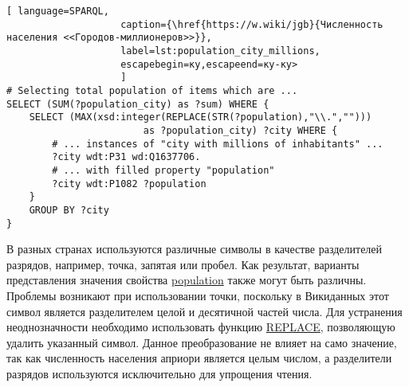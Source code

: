 
\begin{lstlisting}[ language=SPARQL, 
                    caption={\href{https://w.wiki/jgb}{Численность населения <<Городов-миллионеров>>}},
                    label=lst:population_city_millions, 
                    escapebegin=ку,escapeend=ку-ку>
                    ]
# Selecting total population of items which are ...
SELECT (SUM(?population_city) as ?sum) WHERE {
	SELECT (MAX(xsd:integer(REPLACE(STR(?population),"\\.",""))) 
						as ?population_city) ?city WHERE {
		# ... instances of "city with millions of inhabitants" ...
		?city wdt:P31 wd:Q1637706.
		# ... with filled property "population"
		?city wdt:P1082 ?population
	}
	GROUP BY ?city
}
\end{lstlisting}

В разных странах используются различные символы в качестве разделителей разрядов, например, точка, запятая или пробел. Как результат, варианты представления значения свойства \href{https://www.wikidata.org/wiki/Property:P1082}{population} также могут быть различны. Проблемы возникают при использовании точки, поскольку в Викиданных этот символ является разделителем целой и десятичной частей числа. Для устранения неоднозначности необходимо использовать функцию \href{https://en.wikibooks.org/wiki/SPARQL/Expressions_and_Functions#REPLACE}{REPLACE}, позволяющую удалить указанный символ. Данное преобразование не влияет на само значение, так как численность населения априори является целым числом, а разделители разрядов используются исключительно для упрощения чтения.

